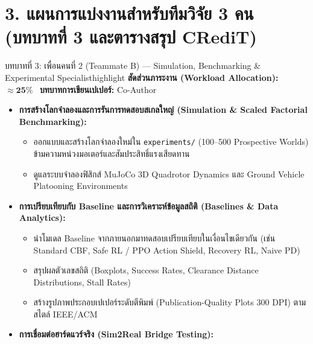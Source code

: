 \documentclass[10pt,a4paper]{article}
\begin{document}
\newpage

\section*{\textcolor{secondary}{\large 3. แผนการแบ่งงานสำหรับทีมวิจัย 3 คน (บทบาทที่ 3 และตารางสรุป CRediT)}}
\vspace{-4pt}

\begin{rolebox}{บทบาทที่ 3: เพื่อนคนที่ 2 (Teammate B) — Simulation, Benchmarking \& Experimental Specialist}{highlight}
  \textbf{สัดส่วนภาระงาน (Workload Allocation):} $\approx \mathbf{25\%}$ \textbar\ \textbf{บทบาทการเขียนเปเปอร์:} Co-Author
  \begin{itemize}[leftmargin=12pt, itemsep=1pt, topsep=1pt, parsep=0pt]
    \item \textbf{การสร้างโลกจำลองและการรันการทดสอบสเกลใหญ่ (Simulation \& Scaled Factorial Benchmarking):}
      \begin{itemize}[itemsep=0.5pt, parsep=0pt]
        \item ออกแบบและสร้างโลกจำลองใหม่ใน \texttt{experiments/} (100–500 Prospective Worlds) ข้ามความหน่วงมอเตอร์และสัมประสิทธิ์แรงเสียดทาน
        \item ดูแลระบบจำลองฟิสิกส์ MuJoCo 3D Quadrotor Dynamics และ Ground Vehicle Platooning Environments
      \end{itemize}
    \item \textbf{การเปรียบเทียบกับ Baseline และการวิเคราะห์ข้อมูลสถิติ (Baselines \& Data Analytics):}
      \begin{itemize}[itemsep=0.5pt, parsep=0pt]
        \item นำโมเดล Baseline จากภายนอกมาทดสอบเปรียบเทียบในเงื่อนไขเดียวกัน (เช่น Standard CBF, Safe RL / PPO Action Shield, Recovery RL, Naive PD)
        \item สรุปผลตัวเลขสถิติ (Boxplots, Success Rates, Clearance Distance Distributions, Stall Rates)
        \item สร้างรูปภาพประกอบเปเปอร์ระดับตีพิมพ์ (Publication-Quality Plots 300 DPI) ตามสไตล์ IEEE/ACM
      \end{itemize}
    \item \textbf{การเชื่อมต่อฮาร์ดแวร์จริง (Sim2Real Bridge Testing):}
      \begin{itemize}[itemsep=0.5pt, parsep=0pt]

\end{itemize}
\end{itemize}
\end{rolebox}
\end{document}
